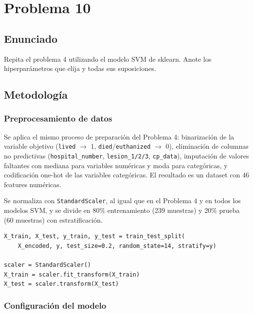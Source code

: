 \documentclass{article}
\begin{document}
\section{Problema 10}

\subsection{Enunciado}

Repita el problema 4 utilizando el modelo SVM de sklearn. Anote los hiperparámetros que elija y todas sus suposiciones.

\subsection{Metodología}

\subsubsection{Preprocesamiento de datos}

Se aplica el mismo proceso de preparación del Problema 4: binarización de la variable objetivo (\texttt{lived} $\rightarrow$ 1, \texttt{died}/\texttt{euthanized} $\rightarrow$ 0), eliminación de columnas no predictivas (\texttt{hospital\_number}, \texttt{lesion\_1/2/3}, \texttt{cp\_data}), imputación de valores faltantes con mediana para variables numéricas y moda para categóricas, y codificación one-hot de las variables categóricas. El resultado es un dataset con 46 features numéricas.

Se normaliza con \texttt{StandardScaler}, al igual que en el Problema 4 y en todos los modelos SVM, y se divide en 80\% entrenamiento (239 muestras) y 20\% prueba (60 muestras) con estratificación.

\begin{lstlisting}
X_train, X_test, y_train, y_test = train_test_split(
    X_encoded, y, test_size=0.2, random_state=14, stratify=y)

scaler = StandardScaler()
X_train = scaler.fit_transform(X_train)
X_test = scaler.transform(X_test)
\end{lstlisting}

\subsubsection{Configuración del modelo}
\end{document}
